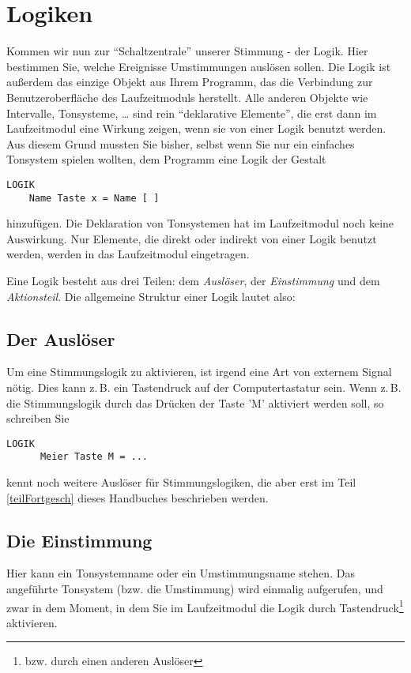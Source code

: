 \chapter{Logiken}\label{cha:logiken}
Kommen wir nun zur "`Schaltzentrale"' unserer Stimmung - der Logik.
Hier bestimmen Sie, welche Ereignisse Umstimmungen auslösen sollen.
Die Logik ist außerdem das einzige Objekt aus Ihrem Programm, das die
Verbindung zur Benutzeroberfläche des Laufzeitmoduls herstellt. Alle
anderen Objekte wie Intervalle, Tonsysteme, \dots{} sind rein
"`deklarative Elemente"', die erst dann im Laufzeitmodul eine Wirkung
zeigen, wenn sie von einer Logik benutzt werden. Aus diesem Grund
mussten Sie bisher, selbst wenn Sie nur ein einfaches Tonsystem spielen
wollten, dem Programm eine Logik der Gestalt
\begin{verbatim}
LOGIK
    Name Taste x = Name [ ]
\end{verbatim}
hinzufügen. Die Deklaration von Tonsystemen hat im Laufzeitmodul
noch keine Auswirkung. Nur Elemente, die direkt oder indirekt von einer
Logik benutzt werden, werden in das Laufzeitmodul eingetragen.

Eine Logik besteht aus drei Teilen: dem \emph{Auslöser}, der {\em
  Einstimmung} und dem \emph{Aktionsteil}. Die allgemeine Struktur
einer Logik lautet also:


\section{Der Auslöser}\label{sec:der-ausloser}
Um eine Stimmungslogik zu aktivieren, ist irgend eine Art von externem
Signal nötig. Dies kann z.\,B. ein Tastendruck auf der Computertastatur
sein. Wenn z.\,B. die Stimmungslogik  durch das Drücken der
Taste 'M' aktiviert werden soll, so schreiben Sie
\begin{verbatim}
LOGIK
      Meier Taste M = ...
\end{verbatim}
\mutabor{} kennt noch weitere Auslöser für Stimmungslogiken, die aber
erst im Teil \ref{teilFortgesch} dieses Handbuches beschrieben werden.

\section{Die Einstimmung}\label{sec:die-einstimmung}
Hier kann ein Tonsystemname oder ein Umstimmungsname stehen. Das
angeführte Tonsystem (bzw. die Umstimmung) wird einmalig aufgerufen,
und zwar in dem Moment, in dem Sie im Laufzeitmodul die Logik durch
Tastendruck\footnote{bzw. durch einen anderen Auslöser} aktivieren.

